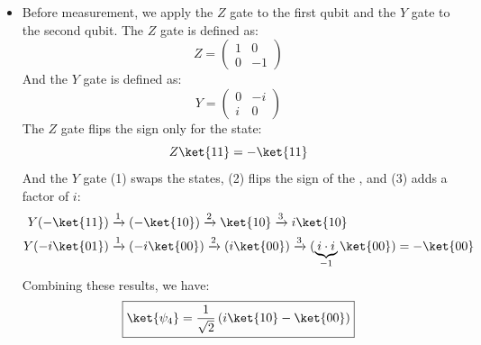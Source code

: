 \begin{itemize}
    \item Before measurement, we apply the $Z$ gate to the first qubit and the $Y$ gate to the second qubit. The $Z$ gate is defined as:
        \begin{equation*}
            Z =
            \begin{pmatrix}
                1 & 0 \\
                0 & -1
            \end{pmatrix}
        \end{equation*}
        And the $Y$ gate is defined as:
        \begin{equation*}
            Y =
            \begin{pmatrix}
                0 & -i \\
                i & 0
            \end{pmatrix}
        \end{equation*}
        The $Z$ gate flips the sign only for the  state:
        \begin{equation*}
            Z\ket{11} = -\ket{11}
        \end{equation*}
        And the $Y$ gate (1) swaps the states, (2) flips the sign of the , and (3) adds a factor of $i$:
        \begin{align*}
            Y(-\ket{11}) &\xrightarrow{1} (-\ket{10}) \xrightarrow{2} \ket{10} \xrightarrow{3} i\ket{10} \\
            Y(-i\ket{01}) &\xrightarrow{1} (-i\ket{00}) \xrightarrow{2} (i\ket{00}) \xrightarrow{3} (\underbrace{i \cdot i}_{-1}\ket{00}) = -\ket{00}
        \end{align*}
        Combining these results, we have:
        \begin{equation*}
            \boxed{\ket{\psi_{4}} = \frac{1}{\sqrt{2}} \left(i\ket{10} - \ket{00}\right)}
        \end{equation*}


\end{itemize}
